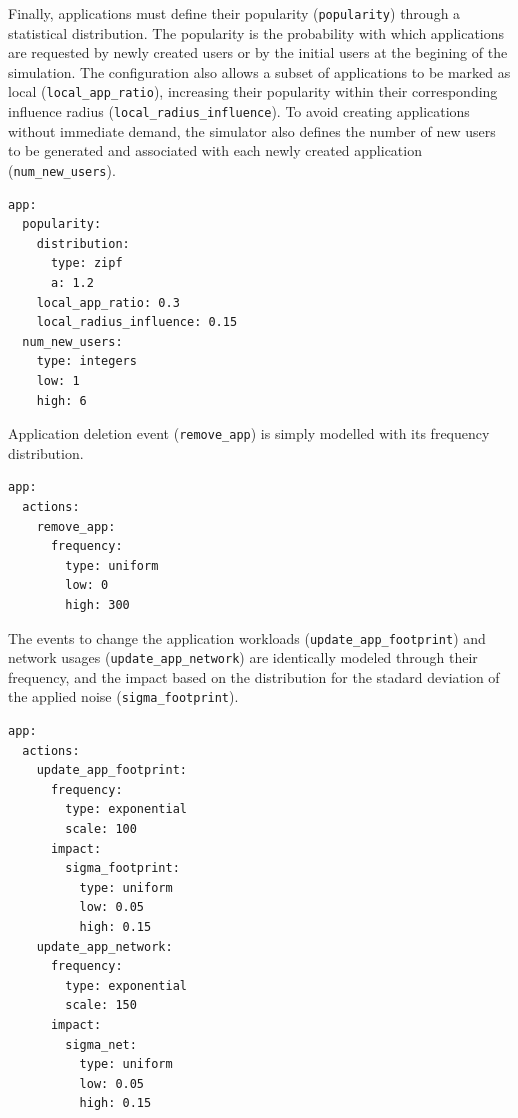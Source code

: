 \documentclass[ASNA]{USG} %
\begin{document}
Finally, applications must define their popularity (\texttt{popularity}) through a statistical distribution. The popularity is the probability with which applications are requested by newly created users or by the initial users at the begining of the simulation. The configuration also allows a subset of applications to be marked as local (\texttt{local\_app\_ratio}), increasing their popularity within their corresponding influence radius (\texttt{local\_radius\_influence}). To avoid creating applications without immediate demand, the simulator also defines the number of new users to be generated and associated with each newly created application (\texttt{num\_new\_users}).

\begin{lstlisting}[caption={YAML configuration for application popularity lifecycle.},label=lst:user_event, basicstyle=\fontsize{8}{10}\selectfont\ttfamily]
app:
  popularity:
    distribution:
      type: zipf
      a: 1.2
    local_app_ratio: 0.3
    local_radius_influence: 0.15
  num_new_users:
    type: integers
    low: 1
    high: 6
\end{lstlisting}



\label{anex_appsevents}

Application deletion event (\texttt{remove\_app}) is simply modelled with its frequency distribution. 

\begin{lstlisting}[caption={YAML configuration for removal application event.},label=lst:user_event, basicstyle=\fontsize{8}{10}\selectfont\ttfamily]
app:
  actions:
    remove_app:
      frequency:
        type: uniform
        low: 0
        high: 300
\end{lstlisting}

The events to change the application workloads (\texttt{update\_app\_footprint}) and network usages (\texttt{update\_app\_network}) are identically modeled through their frequency, and the impact based on the distribution for the stadard deviation of the applied noise (\texttt{sigma\_footprint}).

\begin{lstlisting}[caption={YAML configuration for application workload changes events.},label=lst:user_event, basicstyle=\fontsize{8}{10}\selectfont\ttfamily]
app:
  actions:
    update_app_footprint:
      frequency:
        type: exponential
        scale: 100
      impact:
        sigma_footprint:
          type: uniform
          low: 0.05
          high: 0.15
    update_app_network:
      frequency:
        type: exponential
        scale: 150
      impact:
        sigma_net:
          type: uniform
          low: 0.05
          high: 0.15
\end{lstlisting}
\end{document}
